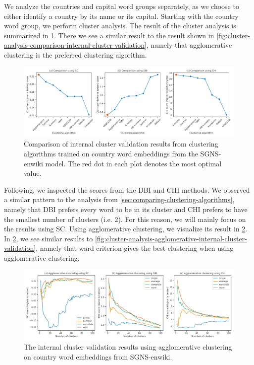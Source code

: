 We analyze the countries and capital word groups separately, as we choose to either identify a country by its name or its capital. Starting with the country word group, we perform cluster analysis. The result of the cluster analysis is summarized in \cref{fig:cluster-analysis-country-word-group-internal-cluster-validation}. There we see a similar result to the result shown in \cref{fig:cluster-analysis-comparison-internal-cluster-validation}, namely that agglomerative clustering is the preferred clustering algorithm.
\begin{figure}[H]
    \centering
    \includegraphics[width=\textwidth]{thesis/figures/cluster-analysis-country-word-group-internal-cluster-validation.pdf}
    \caption{Comparison of internal cluster validation results from clustering algorithms trained on country word embeddings from the SGNS-enwiki model. The red dot in each plot denotes the most optimal value.}
    \label{fig:cluster-analysis-country-word-group-internal-cluster-validation}
\end{figure}

Following, we inspected the scores from the DBI and CHI methods. We observed a similar pattern to the analysis from \cref{sec:comparing-clustering-algorithms}, namely that DBI prefers every word to be in its cluster and CHI prefers to have the smallest number of clusters (i.e. 2). For this reason, we will mainly focus on the results using SC. Using agglomerative clustering, we visualize its result in \cref{fig:cluster-analysis-agglomerative-country-word-group-internal-cluster-validation}. In \cref{fig:cluster-analysis-agglomerative-country-word-group-internal-cluster-validation}, we see similar results to \cref{fig:cluster-analysis-agglomerative-internal-cluster-validation}, namely that ward criterion gives the best clustering when using agglomerative clustering.
\begin{figure}[H]
    \centering
    \includegraphics[width=\textwidth]{thesis/figures/cluster-analysis-agglomerative-country-word-group-internal-cluster-validation.pdf}
    \caption{The internal cluster validation results using agglomerative clustering on country word embeddings from SGNS-enwiki.}
    \label{fig:cluster-analysis-agglomerative-country-word-group-internal-cluster-validation}
\end{figure}

